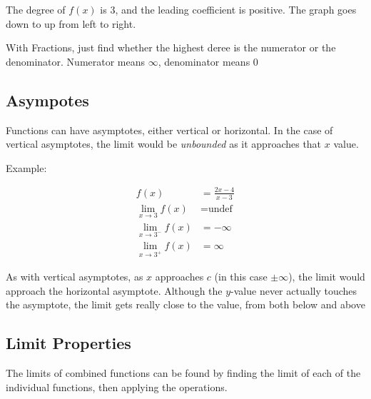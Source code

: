 \documentclass[12pt]{article}
\newcommand{\uit}[1]{\textit{#1}}
\begin{document}
    The degree of $f(x)$ is 3, and the leading coefficient is positive. The graph
    goes down to up from left to right.

    With Fractions, just find whether the highest deree is the numerator or the denominator. 
    Numerator means $\infty$, denominator means $0$

    \subsection{Asympotes}
    Functions can have asymptotes, either vertical or horizontal. In the case of vertical asymptotes, the limit
    would be \uit{unbounded} as it approaches that $x$ value. 

    \noindent Example:

    \[
        \begin{aligned}
            f(x) &= \frac{2x-4}{x-3}\\
            \lim_{x \to 3} f(x) &= \text{undef} \\
            \lim_{x \to 3^-} f(x) &= -\infty \\
            \lim_{x \to 3^+} f(x) &= \infty 
        \end{aligned}
    \]

    As with vertical asymptotes, as $x$ approaches $c$ (in this case $\pm\infty$), the limit would
    approach the horizontal asymptote. Although the $y$-value never actually touches the 
    asymptote, the limit gets really close to the value, from both below and above

    \subsection{Limit Properties}

    The limits of combined functions can be found by finding the limit of each of the 
    individual functions, then applying the operations.
\end{document}
